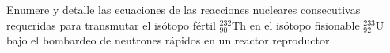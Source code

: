 \item Enumere y detalle las ecuaciones de las reacciones nucleares consecutivas requeridas para transmutar el isótopo fértil $^{232}_{90}\text{Th}$ en el isótopo fisionable $^{233}_{92}\text{U}$ bajo el bombardeo de neutrones rápidos en un reactor reproductor.
